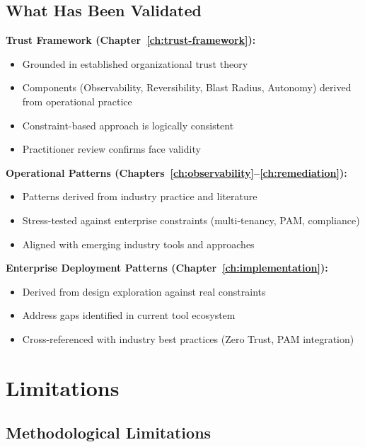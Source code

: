 \subsection{What Has Been Validated}
\label{subsec:validated}

\textbf{Trust Framework (Chapter~\ref{ch:trust-framework}):}
\begin{itemize}
    \item Grounded in established organizational trust theory \citep{mayer1995}
    \item Components (Observability, Reversibility, Blast Radius, Autonomy) derived from operational practice
    \item Constraint-based approach is logically consistent
    \item Practitioner review confirms face validity
\end{itemize}

\textbf{Operational Patterns (Chapters~\ref{ch:observability}--\ref{ch:remediation}):}
\begin{itemize}
    \item Patterns derived from industry practice and literature
    \item Stress-tested against enterprise constraints (multi-tenancy, PAM, compliance)
    \item Aligned with emerging industry tools and approaches
\end{itemize}

\textbf{Enterprise Deployment Patterns (Chapter~\ref{ch:implementation}):}
\begin{itemize}
    \item Derived from design exploration against real constraints
    \item Address gaps identified in current tool ecosystem
    \item Cross-referenced with industry best practices (Zero Trust, PAM integration)
\end{itemize}

\section{Limitations}
\label{sec:limitations}

\subsection{Methodological Limitations}
\label{subsec:methodological-limitations}

